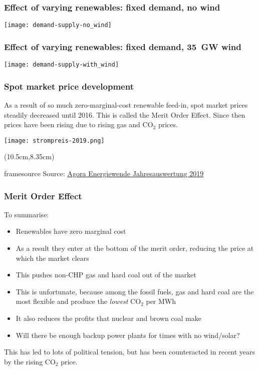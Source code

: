 \documentclass[10pt,aspectratio=169,dvipsnames]{beamer}
\def\co2{CO${}_2$}
\newcommand{\source}[1]{\begin{textblock*}{5cm}(10.5cm,8.35cm)
    \begin{beamercolorbox}[ht=0.5cm,right]{framesource}
        \usebeamerfont{framesource}\usebeamercolor[fg]{framesource} Source: {#1}
    \end{beamercolorbox}
\end{textblock*}}
\let\olditem\item
\renewcommand{\item}{%
\olditem\vspace{5pt}}
\begin{document}
\begin{frame}
  \frametitle{Effect of varying renewables: fixed demand, no wind}

  \centering
  \texttt{[image: demand-supply-no\_wind]}

\end{frame}



\begin{frame}
  \frametitle{Effect of varying renewables: fixed demand, 35~GW wind}

  \centering
  \texttt{[image: demand-supply-with\_wind]}

\end{frame}


\begin{frame}
  \frametitle{Spot market price development}

  As a result of so much zero-marginal-cost renewable feed-in, spot
  market prices steadily decreased until 2016. This is called the
  \alert{Merit Order Effect}.  Since then prices have been rising due
  to rising gas and CO$_2$ prices.


  \centering
  \texttt{[image: strompreis-2019.png]}

  \source{\href{https://www.agora-energiewende.de/fileadmin2/Projekte/2019/Jahresauswertung_2019/171_A-EW_Jahresauswertung_2019_WEB.pdf}{Agora Energiewende Jahresauswertung 2019}}
\end{frame}




\begin{frame}
  \frametitle{Merit Order Effect}

  To summarise:
  \begin{itemize}
  \item Renewables have zero marginal cost
  \item As a result they enter at the bottom of the merit order, reducing the price at which the market clears
  \item This pushes non-CHP gas and hard coal out of the market
  \item This is unfortunate, because among the fossil fuels, gas and
    hard coal are the most flexible and produce the \emph{lowest} \co2
    per MWh
  \item It also reduces the profits that nuclear and brown coal make
  \item Will there be enough backup power plants for times with no wind/solar?
  \end{itemize}

  This has led to lots of political tension, but has been counteracted in recent years by the rising CO$_2$ price.

\end{frame}
\end{document}
